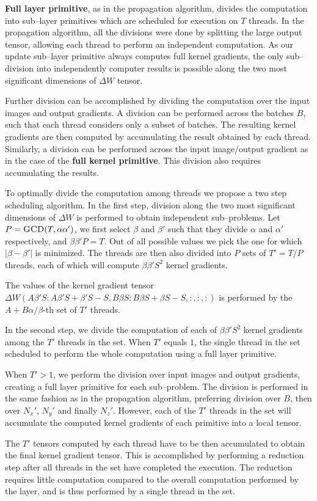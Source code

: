   {\bf Full layer primitive}, as in the propagation algorithm, divides
  the computation into sub--layer primitives which are scheduled for
  execution on $T$ threads.  In the propagation algorithm, all the
  divisions were done by splitting the large output tensor, allowing
  each thread to perform an independent computation.  As our update
  sub--layer primitive always computes full kernel gradients, the only
  sub--division into independently computer results is possible along
  the two most significant dimensions of $\Delta W$ tensor.

  Further division can be accomplished by dividing the computation
  over the input images and output gradients.  A division can be
  performed across the batches $B$, such that each thread considers
  only a subset of batches.  The resulting kernel gradients are then
  computed by accumulating the result obtained by each thread.
  Similarly, a division can be performed across the input image/output
  gradient as in the case of the {\bf full kernel primitive}.  This
  division also requires accumulating the results.

  To optimally divide the computation among threads we propose a two
  step scheduling algorithm.  In the first step, division along the
  two most significant dimensions of $\Delta W$ is performed to obtain
  independent sub--problems.  Let $P = \textnormal{\scshape GCD}(T,\alpha\alpha')$,
  we first select $\beta$ and $\beta'$ such that they divide $\alpha$
  and $\alpha'$ respectively, and $\beta\beta'P = T$.  Out of all
  possible values we pick the one for which $|\beta -\beta'|$ is
  minimized.  The threads are then also divided into $P$ sets of
  $T'=T/P$ threads, each of which will compute $\beta\beta'S^2$ kernel
  gradients.

  The values of the kernel gradient tensor $\Delta W(A
  \beta'S:A\beta'S+\beta'S-S,B \beta S: B\beta S + \beta S -S, :,:,:)$ is
  performed by the $A + B \alpha / \beta$-th set of $T'$ threads.

  In the second step, we divide the computation of each of
  $\beta\beta'S^2$ kernel gradients among the $T'$ threads in the set.
  When $T'$ equals $1$, the single thread in the set scheduled to
  perform the whole computation using a full layer primitive.

  When $T'>1$, we perform the division over input images and output
  gradients, creating a full layer primitive for each sub--problem.
  The division is performed in the same fashion as in the propagation
  algorithm, preferring division over $B$, then over $N_x'$, $N_y'$
  and finally $N_z'$.  However, each of the $T'$ threads in the set
  will accumulate the computed kernel gradients of each primitive into
  a local tensor.

  The $T'$ tensors computed by each thread have to be then accumulated
  to obtain the final kernel gradient tensor.  This is accomplished by
  performing a reduction step after all threads in the set have
  completed the execution. The reduction requires little computation
  compared to the overall computation performed by the layer, and is
  thus performed by a single thread in the set.
